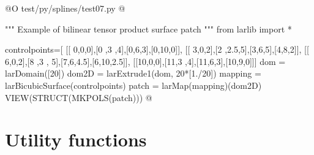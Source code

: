 \documentclass[11pt,oneside]{article}	%
\begin{document}
@O test/py/splines/test07.py
@{""" Example of bilinear tensor product surface patch """
from larlib import *

controlpoints=[
	[[ 0,0,0],[0 ,3  ,4],[0,6,3],[0,10,0]],
	[[ 3,0,2],[2 ,2.5,5],[3,6,5],[4,8,2]],
	[[ 6,0,2],[8 ,3 , 5],[7,6,4.5],[6,10,2.5]],
	[[10,0,0],[11,3  ,4],[11,6,3],[10,9,0]]]
dom = larDomain([20])
dom2D = larExtrude1(dom, 20*[1./20])
mapping = larBicubicSurface(controlpoints)
patch = larMap(mapping)(dom2D)
VIEW(STRUCT(MKPOLS(patch)))
@}



\appendix
\section{Utility functions}





\end{document}
